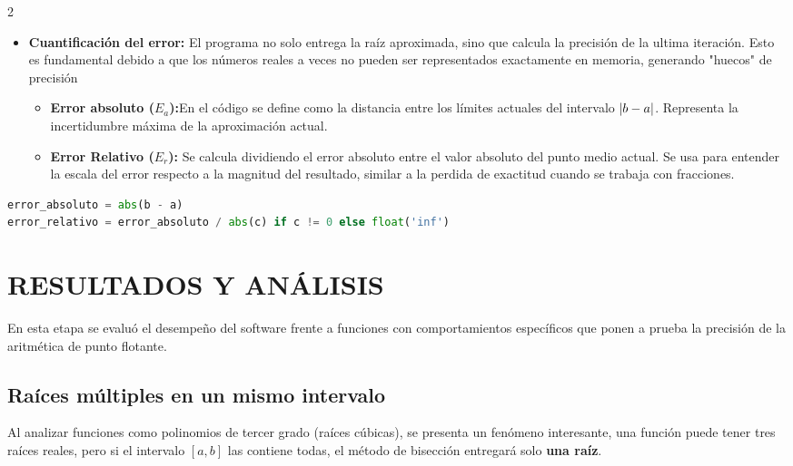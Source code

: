 \documentclass{rmf-d}
\begin{document}
\begin{multicols}{2}
\begin{itemize}
    \begin{lstlisting}[language=Python, caption={Operación del punto medio y lógica de decisión.}]
c = a + (b - a) / 2
if f(a) * f(c) < 0:
    b = c  
else:
    a = c  
\end{lstlisting}
    \item \textbf{Cuantificación del error:} El programa no solo entrega la raíz aproximada, sino que calcula la precisión de la ultima iteración. Esto es fundamental debido a que los números reales a veces no pueden ser representados exactamente en memoria, generando "huecos" de precisión
    \begin{itemize}
        \item \textbf{Error absoluto ($E_a$):}En el código se define como la distancia entre los límites actuales del intervalo $\abs{b-a}$. Representa la incertidumbre máxima de la aproximación actual.
        \item \textbf{Error Relativo ($E_r$):} Se calcula dividiendo el error absoluto entre el valor absoluto del punto medio actual. Se usa para entender la escala del error respecto a la magnitud del resultado, similar a la perdida de exactitud cuando se trabaja con fracciones.
    \end{itemize}
\end{itemize}

\begin{lstlisting}[language=Python, caption={Cálculo de errores según la implementación del programa.}]
error_absoluto = abs(b - a)
error_relativo = error_absoluto / abs(c) if c != 0 else float('inf')   
\end{lstlisting}


















\section{RESULTADOS Y ANÁLISIS}
\label{sec:4}
En esta etapa se evaluó el desempeño del software frente a funciones con comportamientos específicos que ponen a prueba la precisión de la aritmética de punto flotante.

\subsection{Raíces múltiples en un mismo intervalo}
Al analizar funciones como polinomios de tercer grado (raíces cúbicas), se presenta un fenómeno interesante, una función puede tener tres raíces reales, pero si el intervalo $[a,b]$ las contiene todas, el método de bisección entregará solo \textbf{una raíz}.


\end{multicols}
\end{document}
